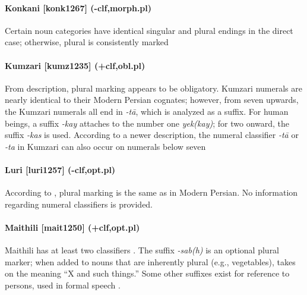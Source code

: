 \paragraph{Konkani [konk1267] (-clf,morph.pl)}
Certain noun categories have identical singular and plural endings in the direct case; otherwise, plural is consistently marked \citep[126ff.]{Almeida1989}
\paragraph{Kumzari [kumz1235] (+clf,obl.pl)}
From  description, plural marking appears to be obligatory. Kumzari numerals are nearly identical to their Modern Persian cognates; however, from seven upwards, the Kumzari numerals all end in {\it -t\=a}, which is analyzed as a suffix. For human beings, a suffix {\it -kay} attaches to the number one {\it yek(kay)}; for two onward, the suffix {\it -kas} is used. According to a newer description, the numeral classifier {\it -t\=a} or {\it -ta} in Kumzari can also occur on numerals below seven \citep[47]{WalAnonby2015}
\paragraph{Luri [luri1257] (-clf,opt.pl)}
According to \citet{MacKinnon2003}, plural marking is the same as in Modern Persian. No information regarding numeral classifiers is provided.
\paragraph{Maithili [mait1250] (+clf,opt.pl)}
Maithili has at least two classifiers \citep[v.\ 1, 117]{Burghart1992}. The suffix {\it -sab(h)} is an optional plural marker; when added to nouns that are inherently plural (e.g., vegetables), takes on the meaning ``X and such things.'' Some other suffixes exist for reference to persons, used in formal speech \citep[v.\ 1, 50-1]{Burghart1992}.
